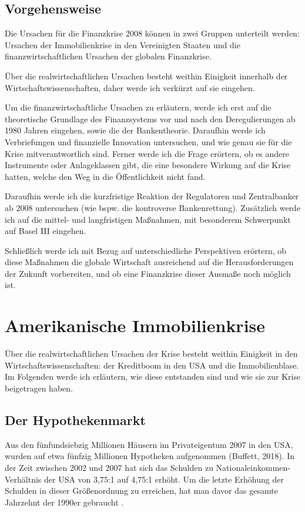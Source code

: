 \documentclass[a4paper,11pt]{report}
\begin{document}
\section{Vorgehensweise}
Die Ursachen für die Finanzkrise 2008 können 
in zwei Gruppen unterteilt werden: Ursachen der Immobilienkrise
in den Vereinigten Staaten und die finanzwirtschaftlichen
Ursachen der globalen Finanzkrise.

\"Uber die realwirtschaftlichen Ursachen besteht weithin
Einigkeit innerhalb der Wirtschaftswissenschaften, daher
werde ich verk\"urzt auf sie eingehen.

Um die finanzwirtschaftliche Ursachen zu erläutern, werde
ich erst auf die theoretische Grundlage des Finanzsystems
vor und nach den Deregulierungen ab 1980 Jahren eingehen,
sowie die der Bankentheorie. Daraufhin werde ich Verbriefungen
und finanzielle Innovation untersuchen, und wie genau sie für die
Krise mitverantwortlich sind. Ferner werde ich
die Frage erörtern, ob es andere Instrumente
oder Anlageklassen gibt, die eine
besondere Wirkung auf die Krise hatten, welche den
Weg in die \"Offentlichkeit nicht fand.

Daraufhin werde ich die kurzfristige Reaktion
der Regulatoren und Zentralbanker ab 2008
untersuchen (wie bspw. die kontroverse
Bankenrettung). Zus\"atzlich werde ich auf die mittel- und
langfristigen Maßnahmen, mit besonderem Schwerpunkt auf Basel
III eingehen.

Schließlich werde ich mit Bezug auf
unterschiedliche Perspektiven
erörtern, ob diese Maßnahmen die globale
Wirtschaft ausreichend auf die
Herausforderungen der Zukunft vorbereiten,
und ob eine Finanzkrise dieser Ausmaße noch m\"oglich ist.

\chapter{Amerikanische Immobilienkrise}
Über die realwirtschaftlichen Ursachen der Krise besteht
weithin Einigkeit in den Wirtschaftswissenschaften: 
der Kreditboom in den USA und die Immobilienblase.
Im Folgenden werde ich erläutern, wie diese entstanden
sind und wie sie zur Krise beigetragen haben.

\section{Der Hypothekenmarkt}
Aus den f\"unfundsiebzig Millionen H\"ausern im
Privateigentum 2007 in den USA, wurden auf etwa f\"unfzig Millionen
Hypotheken aufgenommen (Buffett, 2018).
In der Zeit zwischen 2002 und 2007 hat sich das
Schulden zu Nationaleinkommen-Verhältnis
der USA von 3,75:1 auf 4,75:1 erhöht.
Um die letzte Erhöhung der Schulden in
dieser Größenordnung zu erreichen, hat man davor
das gesamte Jahrzehnt der 1990er
gebraucht \parencite[S. 195f.]{acharyar}.
\end{document}
